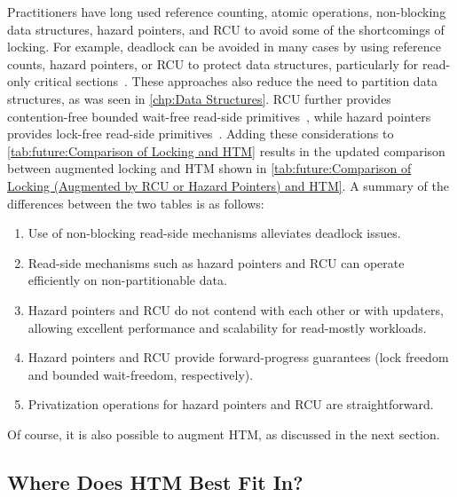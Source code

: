 Practitioners have long used reference counting, atomic operations,
non-blocking data structures, hazard pointers, and RCU to avoid some
of the shortcomings of locking.
For example, deadlock can be avoided in many cases by using reference
counts, hazard pointers, or RCU to protect data structures,
particularly for read-only critical
sections~\cite{MagedMichael04a,HerlihyLM02,MathieuDesnoyers2012URCU,DinakarGuniguntala2008IBMSysJ,ThomasEHart2007a}.
These approaches also reduce the need to partition data
structures, as was seen in \cref{chp:Data Structures}.
RCU further provides contention-free bounded wait-free read-side
primitives~\cite{McKenney98,MathieuDesnoyers2012URCU}, while hazard pointers
provides lock-free read-side
primitives~\cite{Michael02a,HerlihyLM02,MagedMichael04a}.
Adding these considerations to
\cref{tab:future:Comparison of Locking and HTM}
results in the updated comparison between augmented locking and HTM
shown in
\cref{tab:future:Comparison of Locking (Augmented by RCU or Hazard Pointers) and HTM}.
A summary of the differences between the two tables is as follows:

\begin{enumerate}
\item	Use of non-blocking read-side mechanisms alleviates deadlock issues.
\item	Read-side mechanisms such as hazard pointers and RCU can operate
	efficiently on non-partitionable data.
\item	Hazard pointers and RCU do not contend with each other or with
	updaters, allowing excellent performance and scalability for
	read-mostly workloads.
\item	Hazard pointers and RCU provide forward-progress guarantees
	(lock freedom and bounded wait-freedom, respectively).
\item	Privatization operations for hazard pointers and RCU are
	straightforward.
\end{enumerate}


Of course, it is also possible to augment HTM,
as discussed in the next section.

\subsection{Where Does HTM Best Fit In?}
\label{sec:future:Where Does HTM Best Fit In?}

